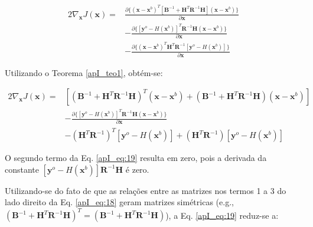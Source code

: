 \begin{equation}
  \label{apI_eq:18}
  \begin{aligned}
    2\nabla_{\mathbf{x}}{J(\mathbf{x})} = {} & \frac{\partial \lbrace(\mathbf{x} - \mathbf{x}^{b})^{T}[\mathbf{B}^{-1} + \mathbf{H}^{T}\mathbf{R}^{-1}\mathbf{H}](\mathbf{x} - \mathbf{x}^{b})\rbrace}{\partial \mathbf{x}} \\
                & - \frac{\partial \lbrace[\mathbf{y}^{o} - \textit{H}(\mathbf{x}^{b})]^{T}\mathbf{R}^{-1}\mathbf{H}(\mathbf{x} - \mathbf{x}^{b})\rbrace}{\partial \mathbf{x}} \\ 
                & - \frac{\partial \lbrace(\mathbf{x} - \mathbf{x}^{b})^{T}\mathbf{H}^{T}\mathbf{R}^{-1}[\mathbf{y}^{o} - \textit{H}(\mathbf{x}^{b})]\rbrace}{\partial \mathbf{x}}
  \end{aligned}  
\end{equation}

Utilizando o Teorema \ref{apI_teo1}, obtém-se:

\begin{equation}
  \label{apI_eq:19}
  \begin{aligned}
    2\nabla_{\mathbf{x}}{J(\mathbf{x})} = {} & [(\mathbf{B}^{-1} + \mathbf{H}^{T}\mathbf{R}^{-1}\mathbf{H})^{T}(\mathbf{x} - \mathbf{x}^{b}) + (\mathbf{B}^{-1} + \mathbf{H}^{T}\mathbf{R}^{-1}\mathbf{H})(\mathbf{x} - \mathbf{x}^{b})] \\
                & - \frac{\partial \lbrace[\mathbf{y}^{o} - \textit{H}(\mathbf{x}^{b})]^{T}\mathbf{R}^{-1}\mathbf{H}(\mathbf{x} - \mathbf{x}^{b})\rbrace}{\partial \mathbf{x}} \\ 
                & - {(\mathbf{H}^{T}\mathbf{R}^{-1})^{T}[\mathbf{y}^{o} - \textit{H}(\mathbf{x}^{b})] + (\mathbf{H}^{T}\mathbf{R}^{-1})[\mathbf{y}^{o} - \textit{H}(\mathbf{x}^{b})]}
  \end{aligned}  
\end{equation}

O segundo termo da Eq. \ref{apI_eq:19} resulta em zero, pois a derivada da constante $[\mathbf{y}^{o} - \textit{H}(\mathbf{x}^{b})]\mathbf{R}^{-1}\mathbf{H}$ é zero.

Utilizando-se do fato de que as relações entre as matrizes nos termos 1 a 3 do lado direito da Eq. \ref{apI_eq:18} geram matrizes simétricas (e.g., $(\mathbf{B}^{-1} + \mathbf{H}^{T}\mathbf{R}^{-1}\mathbf{H})^{T}= (\mathbf{B}^{-1} + \mathbf{H}^{T}\mathbf{R}^{-1}\mathbf{H})$), a Eq. \ref{apI_eq:19} reduz-se a:



